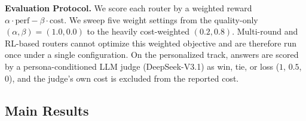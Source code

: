 \noindent\textbf{Evaluation Protocol.}
We score each router by a weighted reward $\alpha \cdot \mathrm{perf} - \beta \cdot \mathrm{cost}$. We sweep five weight settings from the quality-only $(\alpha, \beta) = (1.0, 0.0)$ to the heavily cost-weighted $(0.2, 0.8)$. Multi-round and RL-based routers cannot optimize this weighted objective and are therefore run once under a single configuration. On the personalized track, answers are scored by a persona-conditioned LLM judge (DeepSeek-V3.1) as win, tie, or loss ($1$, $0.5$, $0$), and the judge's own cost is excluded from the reported cost. 

\subsection{Main Results}
\label{sec:results}

